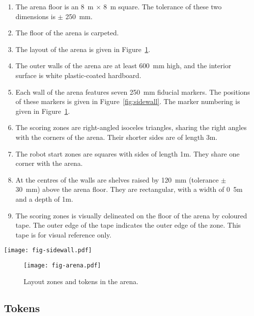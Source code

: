 \begin{enumerate}
  \item The arena floor is an \SI{8}{m} $\times$ \SI{8}{m} square. The tolerance
        of these two dimensions is $\pm$ \SI{250}{mm}.
  \item The floor of the arena is carpeted.
  \item The layout of the arena is given in Figure~\ref{fig:arena}.
  \item The outer walls of the arena are at least \SI{600}{mm} high, and the
        interior surface is white plastic-coated hardboard.
  \item Each wall of the arena features seven \SI{250}{mm} fiducial markers.
        The positions of these markers is given in Figure~\ref{fig:sidewall}.
        The marker numbering is given in Figure~\ref{fig:arena}.
  \item The scoring zones are right-angled isoceles triangles, sharing
        the right angles with the corners of the arena. Their shorter sides are
        of length \si{3}{m}.
  \item The robot start zones are squares with sides of length \si{1}{m}. They
        share one corner with the arena.
  \item At the centres of the walls are shelves raised by \SI{120}{mm}
        (tolerance $\pm$ \SI{30}{mm}) above the arena floor. They are
        rectangular, with a width of \si{0.5}{m} and a depth of \si{1}{m}.
  \item The scoring zones is visually delineated on the floor of
        the arena by coloured tape. The outer edge of the tape indicates the
        outer edge of the zone. This tape is for visual reference only.
\end{enumerate}

\begin{sidewaysfigure}
  \texttt{[image: fig-sidewall.pdf]}
  \caption{Layout of markers along each arena wall.}
  \label{fig:sidewall}
\end{sidewaysfigure}

\begin{figure}
  \texttt{[image: fig-arena.pdf]}
  \caption{Layout zones and tokens in the arena.}
  \label{fig:arena}
\end{figure}

\subsection{Tokens}
\label{spec:tokens}

